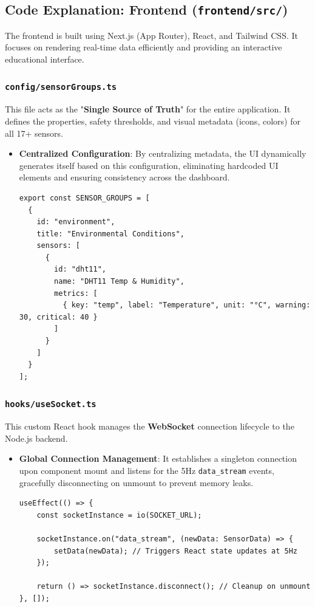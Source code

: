 \documentclass[12pt,a4paper]{article}
\newcommand{\keyword}[1]{\textcolor{keywordcolor}{\textbf{#1}}}
\newcommand{\Q}[1]{\textcolor{questioncolor}{\textbf{#1}}}
\newcommand{\codeinline}[1]{\texttt{\small #1}}
\begin{document}
\vspace{0.5cm}

\subsection*{Code Explanation: Frontend (\texttt{frontend/src/})}

The frontend is built using Next.js (App Router), React, and Tailwind CSS. It focuses on rendering real-time data efficiently and providing an interactive educational interface.

\subsubsection*{\codeinline{config/sensorGroups.ts}}
This file acts as the "\keyword{Single Source of Truth}" for the entire application. It defines the properties, safety thresholds, and visual metadata (icons, colors) for all 17+ sensors.
\begin{itemize}
    \item \Q{Centralized Configuration}:
    By centralizing metadata, the UI dynamically generates itself based on this configuration, eliminating hardcoded UI elements and ensuring consistency across the dashboard.
\begin{verbatim}
export const SENSOR_GROUPS = [
  {
    id: "environment",
    title: "Environmental Conditions",
    sensors: [
      {
        id: "dht11",
        name: "DHT11 Temp & Humidity",
        metrics: [
          { key: "temp", label: "Temperature", unit: "°C", warning: 30, critical: 40 }
        ]
      }
    ]
  }
];
\end{verbatim}
\end{itemize}

\subsubsection*{\codeinline{hooks/useSocket.ts}}
This custom React hook manages the \keyword{WebSocket} connection lifecycle to the Node.js backend.
\begin{itemize}
    \item \Q{Global Connection Management}:
    It establishes a singleton connection upon component mount and listens for the 5Hz \texttt{data\_stream} events, gracefully disconnecting on unmount to prevent memory leaks.
\begin{verbatim}
useEffect(() => {
    const socketInstance = io(SOCKET_URL);
    
    socketInstance.on("data_stream", (newData: SensorData) => {
        setData(newData); // Triggers React state updates at 5Hz
    });

    return () => socketInstance.disconnect(); // Cleanup on unmount
}, []);
\end{verbatim}
\end{itemize}
\end{document}
